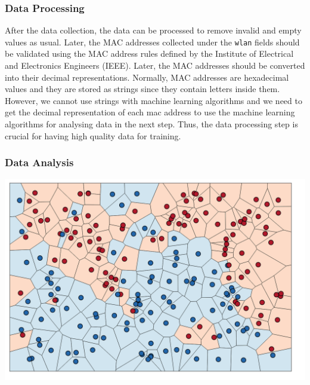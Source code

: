 \documentclass[journal, 12pt]{IEEEtran}
\begin{document}
\subsubsection{Data Processing} 
After the data collection, the data can be processed to remove invalid and empty values as usual. Later, the MAC addresses collected under the \texttt{wlan} fields should be validated using the MAC address rules defined by the Institute of Electrical and Electronics Engineers (IEEE). Later, the MAC addresses should be converted into their decimal representations. Normally, MAC addresses are hexadecimal values and they are stored as strings since they contain letters inside them. However, we cannot use strings with machine learning algorithms and we need to get the decimal representation of each mac address to use the machine learning algorithms for analysing data in the next step. Thus, the data processing step is crucial for having high quality data for training. \\

\subsubsection{Data Analysis} 


\begingroup
    \center
    \medskip
    \includegraphics[width=\columnwidth]{report/interim_report/images/clustering.png}
    \label{fig:clustering}
    \medskip
\endgroup
\end{document}
